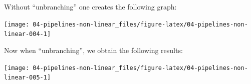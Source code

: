\documentclass[]{scrbook}
\newenvironment{Shaded}{\begin{snugshade}}{\end{snugshade}}
\newcommand{\DataTypeTok}[1]{\textcolor[rgb]{0.13,0.29,0.53}{#1}}
\newcommand{\KeywordTok}[1]{\textcolor[rgb]{0.13,0.29,0.53}{\textbf{#1}}}
\newcommand{\NormalTok}[1]{#1}
\newcommand{\OperatorTok}[1]{\textcolor[rgb]{0.81,0.36,0.00}{\textbf{#1}}}
\newcommand{\OtherTok}[1]{\textcolor[rgb]{0.56,0.35,0.01}{#1}}
\newcommand{\StringTok}[1]{\textcolor[rgb]{0.31,0.60,0.02}{#1}}
\renewenvironment{Shaded} {\begin{snugshade}\small} {\end{snugshade}}
\begin{document}
\begin{Shaded}
\end{Shaded}

Without ``unbranching'' one creates the following graph:

\begin{Shaded}
\end{Shaded}

\begin{center}\texttt{[image: 04-pipelines-non-linear\_files/figure-latex/04-pipelines-non-linear-004-1]} \end{center}

Now when ``unbranching'', we obtain the following results:

\begin{Shaded}
\end{Shaded}

\begin{center}\texttt{[image: 04-pipelines-non-linear\_files/figure-latex/04-pipelines-non-linear-005-1]} \end{center}
\end{document}
